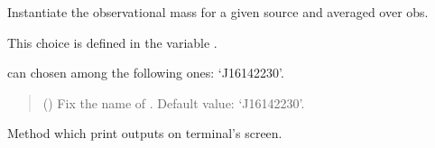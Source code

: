 \documentclass[letterpaper,10pt,english]{sphinxmanual}
\begin{document}
\begin{fulllineitems}
\label{\detokenize{source/api/setup_astro_mr:nucleardatapy.setup_astro_mr.SetupAstroMRAverage}}
\pysigstartsignatures
\pysiglinewithargsret
{}
{}
{}
\pysigstopsignatures
\sphinxAtStartPar
Instantiate the observational mass for a given source and averaged over obs.

\sphinxAtStartPar
This choice is defined in the variable .

\sphinxAtStartPar
{} can chosen among the following ones: ‘J1614\textendash{}2230’.
\begin{quote}\begin{description}
\sphinxAtStartPar
{} (\sphinxstyleliteralemphasis{\sphinxupquote{, }}) \textendash{} Fix the name of . Default value: ‘J1614\textendash{}2230’.

\end{description}\end{quote}

\sphinxAtStartPar
{}

\begin{fulllineitems}
\label{\detokenize{source/api/setup_astro_mr:nucleardatapy.setup_astro_mr.SetupAstroMRAverage.print_outputs}}
\pysigstartsignatures
\pysiglinewithargsret
{}
{}
{}
\pysigstopsignatures
\sphinxAtStartPar
Method which print outputs on terminal’s screen.

\end{fulllineitems}


\end{fulllineitems}

\end{document}

